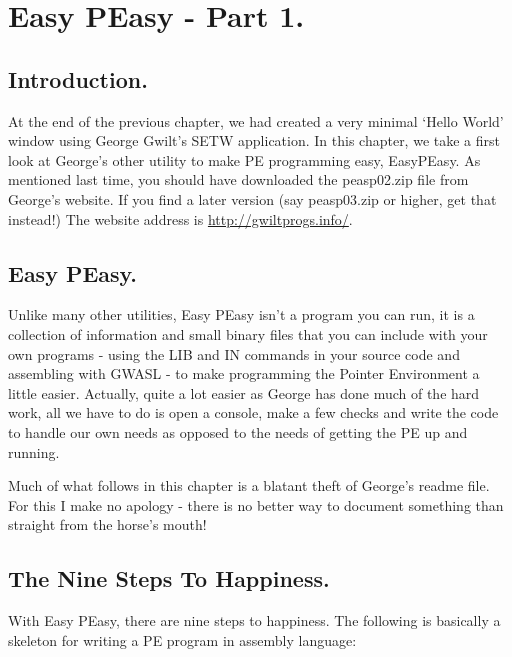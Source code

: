 \chapter{Easy PEasy -{} Part 1.}

\section{Introduction.}
\label{ch25-intro}%

At the end of the previous chapter, we had created a very minimal `Hello
    World' window using George Gwilt's SETW application. In this chapter, we
    take a first look at George's other utility to make PE programming easy,
    EasyPEasy. As mentioned last time, you should have downloaded the
 peasp02.zip file from George's website. If you find a
    later version (say peasp03.zip or higher, get that
    instead!) The website address is \url{http://gwiltprogs.info/}.

\section{Easy PEasy.}
\label{ch25-std-windef-cntd}%

Unlike many other utilities, Easy PEasy isn't a program you can run,
    it is a collection of information and small binary files that you can
    include with your own programs -{} using the LIB and IN commands in your
    source code and assembling with GWASL -{} to make programming the Pointer
    Environment a little easier. Actually, quite a lot easier as George has
    done much of the hard work, all we have to do is open a console, make a
    few checks and write the code to handle our own needs as opposed to the
    needs of getting the PE up and running.

Much of what follows in this chapter is a blatant theft of George's
    readme file. For this I make no apology -{} there is no better way to
    document something than straight from the horse's mouth!

\section{The Nine Steps To Happiness.}

With Easy PEasy, there are nine steps to happiness. The following is
    basically a skeleton for writing a PE program in assembly language:

